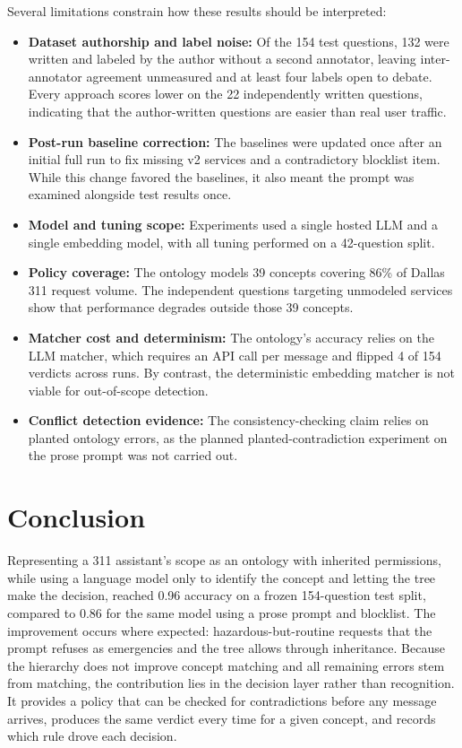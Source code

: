 \documentclass[conference]{IEEEtran}
\begin{document}
Several limitations constrain how these results should be interpreted:
\begin{itemize}
    \item \textbf{Dataset authorship and label noise:} Of the 154 test questions, 132 were written and labeled by the author without a second annotator, leaving inter-annotator agreement unmeasured and at least four labels open to debate. Every approach scores lower on the 22 independently written questions, indicating that the author-written questions are easier than real user traffic.
    \item \textbf{Post-run baseline correction:} The baselines were updated once after an initial full run to fix missing v2 services and a contradictory blocklist item. While this change favored the baselines, it also meant the prompt was examined alongside test results once.
    \item \textbf{Model and tuning scope:} Experiments used a single hosted LLM and a single embedding model, with all tuning performed on a 42-question split.
    \item \textbf{Policy coverage:} The ontology models 39 concepts covering 86\% of Dallas 311 request volume. The independent questions targeting unmodeled services show that performance degrades outside those 39 concepts.
    \item \textbf{Matcher cost and determinism:} The ontology's accuracy relies on the LLM matcher, which requires an API call per message and flipped 4 of 154 verdicts across runs. By contrast, the deterministic embedding matcher is not viable for out-of-scope detection.
    \item \textbf{Conflict detection evidence:} The consistency-checking claim relies on planted ontology errors, as the planned planted-contradiction experiment on the prose prompt was not carried out.
\end{itemize}

\section{Conclusion}

Representing a 311 assistant's scope as an ontology with inherited permissions, while using a language model only to identify the concept and letting the tree make the decision, reached 0.96 accuracy on a frozen 154-question test split, compared to 0.86 for the same model using a prose prompt and blocklist. The improvement occurs where expected: hazardous-but-routine requests that the prompt refuses as emergencies and the tree allows through inheritance. Because the hierarchy does not improve concept matching and all remaining errors stem from matching, the contribution lies in the decision layer rather than recognition. It provides a policy that can be checked for contradictions before any message arrives, produces the same verdict every time for a given concept, and records which rule drove each decision.
\end{document}
